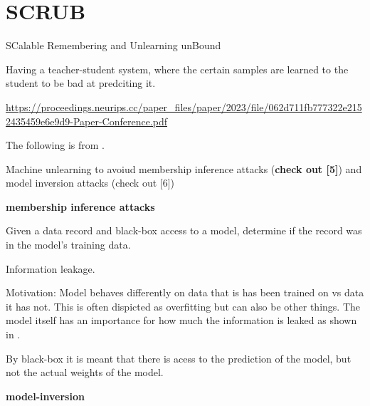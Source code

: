 \section{SCRUB}
SCalable Remembering and Unlearning unBound



Having a teacher-student system, where the certain samples are learned to the student to be bad at predciting it. 

\url{https://proceedings.neurips.cc/paper_files/paper/2023/file/062d711fb777322e2152435459e6e9d9-Paper-Conference.pdf}




The following is from \cite{xu_machine_2023}.

Machine unlearning to avoiud membership inference attacks (\textbf{check out [5]}) and model inversion attacks (check out [6])

\textbf{membership inference attacks}

Given a data record and black-box access to a model, determine if the record was in the model's training data. 

Information leakage.

Motivation: Model behaves differently on data that is has been trained on vs data it has not. This is often dispicted as overfitting but can also be other things. The model itself has an importance for how much the information is leaked as shown in \cite{shokri_membership_2017}. 

By black-box it is meant that there is acess to the prediction of the model, but not the actual weights of the model. 




\textbf{model-inversion}


\cite{fredrikson_model_2015}




